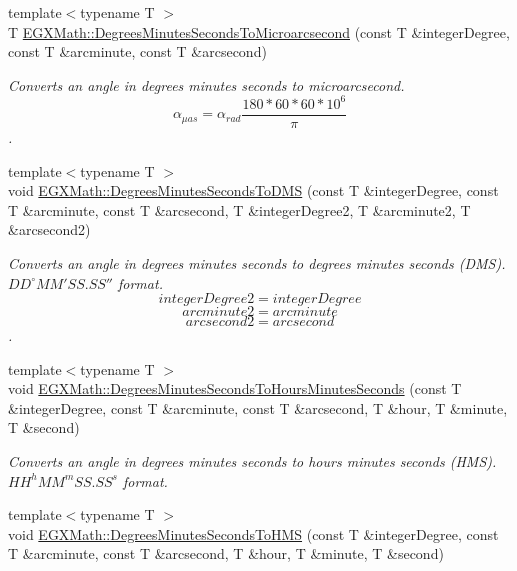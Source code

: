 \begin{DoxyCompactItemize}
{\footnotesize template$<$typename T $>$ }\\T \mbox{\hyperlink{group___e_g_x_math-_conversions-_angle_conversions-_degrees_minutes_seconds_gabc4de7934e776de13953707344a4da88}{E\+G\+X\+Math\+::\+Degrees\+Minutes\+Seconds\+To\+Microarcsecond}} (const T \&integer\+Degree, const T \&arcminute, const T \&arcsecond)
\begin{DoxyCompactList}\small\item\em Converts an angle in degrees minutes seconds to microarcsecond. \[\alpha_{\mu as}=\alpha_{rad}\frac{180 * 60 * 60 * 10^6}{\pi}\]. \end{DoxyCompactList}\item 
{\footnotesize template$<$typename T $>$ }\\void \mbox{\hyperlink{group___e_g_x_math-_conversions-_angle_conversions-_degrees_minutes_seconds_gae6652ea4b358b3f35f6b7c18faffabb2}{E\+G\+X\+Math\+::\+Degrees\+Minutes\+Seconds\+To\+D\+MS}} (const T \&integer\+Degree, const T \&arcminute, const T \&arcsecond, T \&integer\+Degree2, T \&arcminute2, T \&arcsecond2)
\begin{DoxyCompactList}\small\item\em Converts an angle in degrees minutes seconds to degrees minutes seconds (D\+MS). ${DD}^{\circ}{MM}'{SS.SS}''$ format. \[integerDegree2 = integerDegree \] \[arcminute2 = arcminute\] \[arcsecond2 = arcsecond\]. \end{DoxyCompactList}\item 
{\footnotesize template$<$typename T $>$ }\\void \mbox{\hyperlink{group___e_g_x_math-_conversions-_angle_conversions-_degrees_minutes_seconds_ga7fc14ecc37f95ec9228821c3a087e83b}{E\+G\+X\+Math\+::\+Degrees\+Minutes\+Seconds\+To\+Hours\+Minutes\+Seconds}} (const T \&integer\+Degree, const T \&arcminute, const T \&arcsecond, T \&hour, T \&minute, T \&second)
\begin{DoxyCompactList}\small\item\em Converts an angle in degrees minutes seconds to hours minutes seconds (H\+MS). ${HH}^h{MM}^m{SS.SS}^s$ format. \end{DoxyCompactList}\item 
{\footnotesize template$<$typename T $>$ }\\void \mbox{\hyperlink{group___e_g_x_math-_conversions-_angle_conversions-_degrees_minutes_seconds_ga63c1cd3c9048d0c5a80fd9bc851c38ac}{E\+G\+X\+Math\+::\+Degrees\+Minutes\+Seconds\+To\+H\+MS}} (const T \&integer\+Degree, const T \&arcminute, const T \&arcsecond, T \&hour, T \&minute, T \&second)

\end{DoxyCompactItemize}
